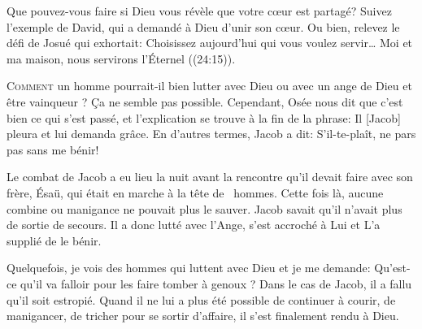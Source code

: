 Que pouvez-vous faire si Dieu vous révèle que votre c\oe{}ur est partagé?
 Suivez l'exemple de David, qui a demandé à Dieu d'unir son c\oe{}ur.
 Ou bien, relevez le défi de Josué qui exhortait: 
 \Og Choisissez aujourd'hui qui vous voulez servir\dots{}
 Moi et ma maison, nous servirons l'Éternel  \Fg{}
 ((24:15)). 

\dvrule







\lettrine{C}{omment} un homme pourrait-il bien lutter avec Dieu
 \ocadr ou avec un ange de Dieu \fcadr{} et être vainqueur ?
 Ça ne semble pas possible.
 Cependant, Osée nous dit que c'est bien ce qui s'est passé,
 et l'explication se trouve à la fin de la phrase:
 \Og Il [Jacob] pleura et lui demanda grâce. \Fg{}
 En d'autres termes, Jacob a dit: 
 \Og S'il-te-plaît, ne pars pas sans me bénir! \Fg{}

Le combat de Jacob a eu lieu la nuit avant la rencontre qu'il devait
 faire avec son frère, Ésaü, qui était en marche à la tête de ~hommes.
 Cette fois là, aucune combine ou manigance ne pouvait plus le sauver.
 Jacob savait qu'il n'avait plus de sortie de secours.
 Il a donc lutté avec l'Ange, s'est accroché à Lui et L'a supplié de le bénir. 


Quelquefois, je vois des hommes qui luttent avec Dieu et je me demande: 
 \Og Qu'est-ce qu'il va falloir pour les faire tomber à genoux ? \Fg{}
 Dans le cas de Jacob, il a fallu qu'il soit estropié.
 Quand il ne lui a plus été possible de continuer à courir, de manigancer,
 de tricher pour se sortir d'affaire, il s'est finalement rendu à Dieu. 

